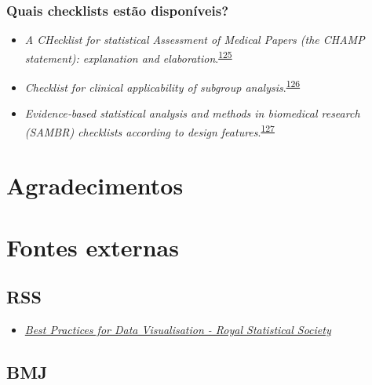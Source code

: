 \documentclass[
]{book}
\providecommand{\tightlist}{%
  \setlength{\itemsep}{0pt}\setlength{\parskip}{0pt}}
\begin{document}
\hypertarget{quais-checklists-estuxe3o-disponuxedveis}{%
\subsection{Quais checklists estão disponíveis?}\label{quais-checklists-estuxe3o-disponuxedveis}}

\begin{itemize}
\item
  \emph{A CHecklist for statistical Assessment of Medical Papers (the CHAMP statement): explanation and elaboration}.\textsuperscript{\protect\hyperlink{ref-Mansournia2021}{125}}
\item
  \emph{Checklist for clinical applicability of subgroup analysis}.\textsuperscript{\protect\hyperlink{ref-Gil-Sierra2020}{126}}
\item
  \emph{Evidence‐based statistical analysis and methods in biomedical research (SAMBR) checklists according to design features}.\textsuperscript{\protect\hyperlink{ref-dwivedi2019}{127}}
\end{itemize}

\hypertarget{agradecimentos}{%
\chapter*{Agradecimentos}\label{agradecimentos}}

\hypertarget{fontes-externas}{%
\chapter{\texorpdfstring{\textbf{Fontes externas}}{Fontes externas}}\label{fontes-externas}}

\hypertarget{rss}{%
\section{RSS}\label{rss}}

\begin{itemize}
\tightlist
\item
  \href{https://royal-statistical-society.github.io/datavisguide/}{\emph{Best Practices for Data Visualisation - Royal Statistical Society}}
\end{itemize}

\hypertarget{bmj}{%
\section{BMJ}\label{bmj}}
\end{document}
